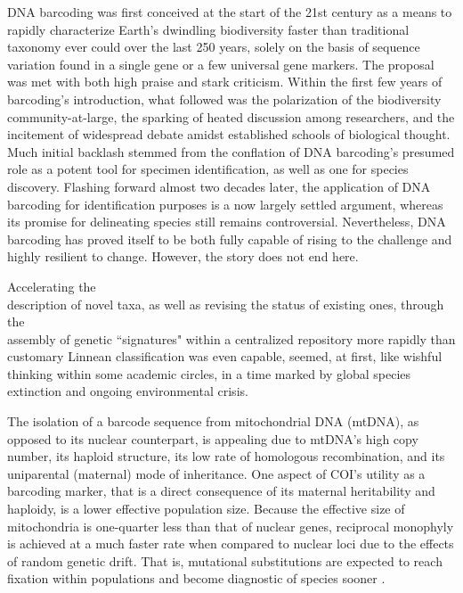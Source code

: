 DNA barcoding was first conceived at the start of the 21st century as a means to rapidly characterize Earth's dwindling biodiversity faster than traditional taxonomy ever could over the last 250 years, solely on the basis of sequence variation found in a single gene or a few universal gene markers. The proposal was met with both high praise and stark criticism. Within the first few years of barcoding's introduction, what followed was the polarization of the biodiversity community-at-large, the sparking of heated discussion among researchers, and the incitement of widespread debate amidst established schools of biological thought. Much initial backlash stemmed from the conflation of DNA barcoding's presumed role as a potent tool for specimen identification, as well as one for species discovery. Flashing forward almost two decades later, the application of DNA barcoding for identification purposes is a now largely settled argument, whereas its promise for  delineating species still remains controversial. Nevertheless, DNA barcoding has proved itself to be both fully capable of rising to the challenge and highly resilient to change. However, the story does not end here.


Accelerating the \\ description of novel taxa, as well as revising the status of existing ones, through the \\ assembly of genetic ``signatures" within a centralized repository more rapidly than \\ customary Linnean classification was even capable, seemed, at first, like wishful thinking within some academic circles, in a time marked by global species extinction and ongoing environmental crisis. 

The isolation of a barcode sequence from mitochondrial DNA (mtDNA), as opposed to its nuclear counterpart, is appealing due to mtDNA's high copy number, its haploid structure, its low rate of homologous recombination, and its uniparental (maternal) mode of inheritance. One aspect of COI's utility as a barcoding marker, that is a direct consequence of its maternal heritability and haploidy, is a lower effective population size. Because the effective size of mitochondria is one-quarter less than that of nuclear genes, reciprocal monophyly is achieved at a much faster rate when compared to nuclear loci due to the effects of random genetic drift. That is, mutational substitutions are expected to reach fixation within populations and become diagnostic of species sooner \cite{hubert2015dna}.


